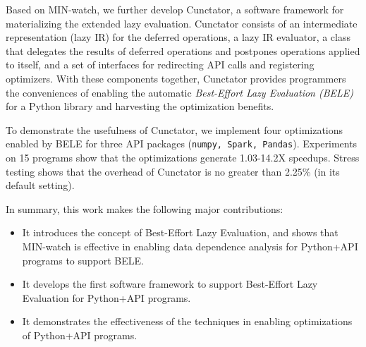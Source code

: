 \documentclass[sigconf]{acmart}\settopmatter{printfolios=true,printccs=false,printacmref=false}\setcopyright{none}
\newcommand {\REV}[1]{#1}
\newcommand {\ST}[1]{}
\begin{document}
Based on MIN-watch, we further develop Cunctator, a software framework for materializing the extended lazy evaluation. Cunctator consists of an intermediate representation (lazy IR) for the deferred operations, a lazy IR evaluator, a class that delegates the results of deferred operations and postpones operations applied to itself, and a set of interfaces for redirecting API calls and registering optimizers. With these components together, Cunctator provides programmers the conveniences of enabling the automatic {\em Best-Effort Lazy Evaluation (BELE)} for a Python library and harvesting the optimization benefits. 

To demonstrate the usefulness of Cunctator, we implement four optimizations  enabled by BELE for three API packages (\texttt{numpy, Spark, Pandas}). Experiments on 15 programs show that the optimizations generate 1.03-14.2X speedups. Stress testing shows that the overhead of Cunctator is no greater than 2.25\% (in its default setting).


In summary, this work makes the following major contributions:

\begin{itemize}
  \item It introduces the concept of Best-Effort Lazy Evaluation, and shows that MIN-watch is effective in enabling data dependence analysis for Python+API programs to support \REV{BELE\ST{Best-Effort Lazy Evaluation}}. 
  
  \item It develops the first software framework to support Best-Effort Lazy Evaluation for Python+API programs.

\item It demonstrates the effectiveness of the techniques in enabling optimizations of Python+API programs. 
    
    
    
\end{itemize}
\end{document}
